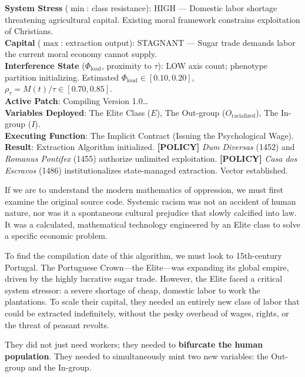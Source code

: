 \documentclass[12pt,openany]{book}
\begin{document}
\begin{tcolorbox}[colback=black!5, colframe=black!70, fonttitle=\bfseries\ttfamily, title=RUNTIME LOG: 1486 (LISBON{,} PORTUGAL)]
\ttfamily\small
\textbf{System Stress} ($\min$: class resistance): HIGH --- Domestic labor shortage threatening agricultural capital. Existing moral framework constrains exploitation of Christians.\\
\textbf{Capital} ($\max$: extraction output): STAGNANT --- Sugar trade demands labor the current moral economy cannot supply.\\
\textbf{Interference State} ($\Phi_{\text{load}}$, proximity to $\tau$): LOW axis count; phenotype partition initializing. Estimated $\Phi_{\text{load}} \in [0.10, 0.20]$, $\rho_{\tau}=M(t)/\tau \in [0.70, 0.85]$.\\
\textbf{Active Patch}: Compiling Version 1.0\ldots\\
\textbf{Variables Deployed}: The Elite Class ($E$), The Out-group ($O_{\text{racialized}}$), The In-group ($I$).\\
\textbf{Executing Function}: The Implicit Contract (Issuing the Psychological Wage).\\
\textbf{Result}: Extraction Algorithm initialized. \textbf{[POLICY]} \textit{Dum Diversas} (1452) and \textit{Romanus Pontifex} (1455) authorize unlimited exploitation. \textbf{[POLICY]} \textit{Casa dos Escravos} (1486) institutionalizes state-managed extraction. Vector established.
\end{tcolorbox}

\medskip

If we are to understand the modern mathematics of oppression, we must first examine the original source code. Systemic racism was not an accident of human nature, nor was it a spontaneous cultural prejudice that slowly calcified into law. It was a calculated, mathematical technology engineered by an Elite class to solve a specific economic problem.

To find the compilation date of this algorithm, we must look to 15th-century Portugal. The Portuguese Crown---the Elite---was expanding its global empire, driven by the highly lucrative sugar trade. However, the Elite faced a critical system stressor: a severe shortage of cheap, domestic labor to work the plantations. To scale their capital, they needed an entirely new class of labor that could be extracted indefinitely, without the pesky overhead of wages, rights, or the threat of peasant revolts.

They did not just need workers; they needed to \textbf{bifurcate the human population}. They needed to simultaneously mint two new variables: the Out-group and the In-group.
\end{document}
